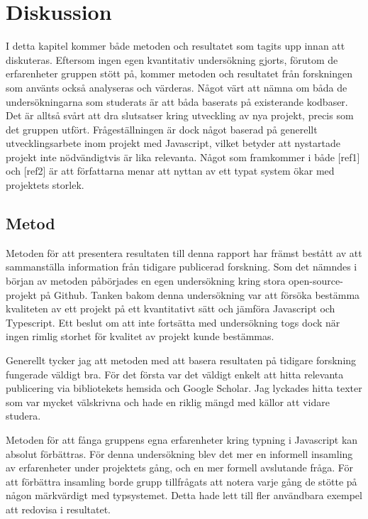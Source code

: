 \section{Diskussion}
\label{sec:alexander-discussion}

I detta kapitel kommer både metoden och resultatet som tagits upp innan att diskuteras. Eftersom ingen egen kvantitativ undersökning gjorts, förutom de erfarenheter gruppen stött på, kommer metoden och resultatet från forskningen som använts också analyseras och värderas.  Något värt att nämna om båda de undersökningarna som studerats är att båda baserats på existerande kodbaser. Det är alltså svårt att dra slutsatser kring utveckling av nya projekt, precis som det gruppen utfört. Frågeställningen är dock något baserad på generellt utvecklingsarbete inom projekt med Javascript, vilket betyder att nystartade projekt inte nödvändigtvis är lika relevanta. Något som framkommer i både [ref1] och [ref2] är att författarna menar att nyttan av ett typat system ökar med projektets storlek. 


\subsection{Metod}
\label{subsec:alexander-discussion-method}

Metoden för att presentera resultaten till denna rapport har främst bestått av att sammanställa information från tidigare publicerad forskning. Som det nämndes i början av metoden påbörjades en egen undersökning kring stora open-source-projekt på Github. Tanken bakom denna undersökning var att försöka bestämma kvaliteten av ett projekt på ett kvantitativt sätt och jämföra Javascript och Typescript. Ett beslut om att inte fortsätta med undersökning togs dock när ingen rimlig storhet för kvalitet av projekt kunde bestämmas.

Generellt tycker jag att metoden med att basera resultaten på tidigare forskning fungerade väldigt bra. För det första var det väldigt enkelt att hitta relevanta publicering via bibliotekets hemsida och Google Scholar. Jag lyckades hitta texter som var mycket välskrivna och hade en riklig mängd med källor att vidare studera.

Metoden för att fånga gruppens egna erfarenheter kring typning i Javascript kan absolut förbättras. För denna undersökning blev det mer en informell insamling av erfarenheter under projektets gång, och en mer formell avslutande fråga. För att förbättra insamling borde grupp tillfrågats att notera varje gång de stötte på någon märkvärdigt med typsystemet. Detta hade lett till fler användbara exempel att redovisa i resultatet.

